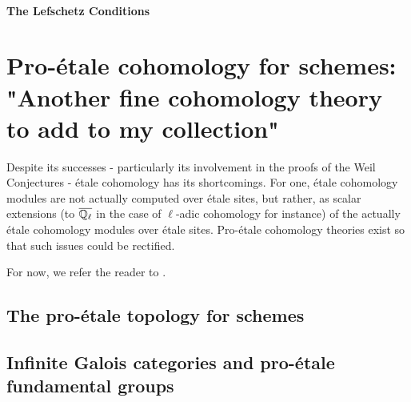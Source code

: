             \paragraph{The Lefschetz Conditions}
            
\section{Pro-\'etale cohomology for schemes: "Another fine cohomology theory to add to my collection"}
    Despite its successes - particularly its involvement in the proofs of the Weil Conjectures - \'etale cohomology has its shortcomings. For one, \'etale cohomology modules are not actually computed over \'etale sites, but rather, as scalar extensions (to $\overline{\mathbb{Q}_{\ell}}$ in the case of $\ell$-adic cohomology for instance) of the actually \'etale cohomology modules over \'etale sites. Pro-\'etale cohomology theories exist so that such issues could be rectified. 
    
    \begin{remark}
        For now, we refer the reader to \cite[Definition 4.1.1 and Remark 4.1.3]{bhatt_scholze_2014_pro_etale}.
    \end{remark}
    
    \subsection{The pro-\'etale topology for schemes}
    
    \subsection{Infinite Galois categories and pro-\'etale fundamental groups}

